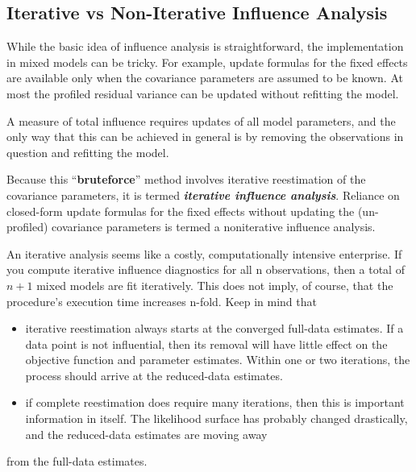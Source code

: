 \documentclass[12pt, a4paper]{article}
\begin{document}
	
	\subsection{Iterative vs Non-Iterative Influence Analysis}
	While the basic idea of influence analysis is straightforward, the implementation in mixed models can be
	tricky. For example, update formulas for the fixed effects are available only when the covariance parameters
	are assumed to be known. At most the profiled residual variance can be updated without refitting the model.
	
	A measure of total influence requires updates of all model parameters, and the only way that this can be
	achieved in general is by removing the observations in question and refitting the model. 
	
	Because this “\textbf{bruteforce}”
	method involves iterative reestimation of the covariance parameters, it is termed \textbf{\textit{iterative influence
			analysis}}. Reliance on closed-form update formulas for the fixed effects without updating the (un-profiled)
	covariance parameters is termed a noniterative influence analysis.
	
	An iterative analysis seems like a costly, computationally intensive enterprise. If you compute iterative
	influence diagnostics for all n observations, then a total of $n + 1$ mixed models are fit iteratively. This does
	not imply, of course, that the procedure’s execution time increases n-fold. Keep in mind that
	\begin{itemize}
		\item iterative reestimation always starts at the converged full-data estimates. If a data point is not influential,
		then its removal will have little effect on the objective function and parameter estimates. Within
		one or two iterations, the process should arrive at the reduced-data estimates.
		\item if complete reestimation does require many iterations, then this is important information in itself. The
		likelihood surface has probably changed drastically, and the reduced-data estimates are moving away
	\end{itemize}
	from the full-data estimates.
			
			
			
		
\end{document}
